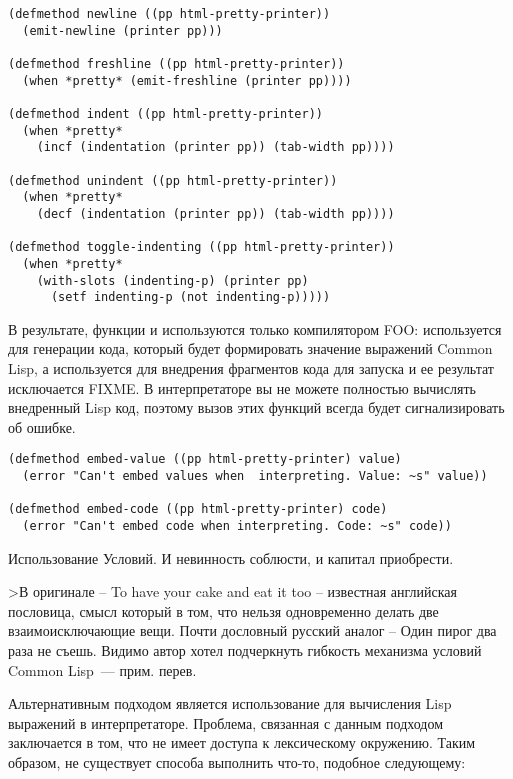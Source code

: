 \begin{lstlisting}
(defmethod newline ((pp html-pretty-printer))
  (emit-newline (printer pp)))

(defmethod freshline ((pp html-pretty-printer))
  (when *pretty* (emit-freshline (printer pp))))

(defmethod indent ((pp html-pretty-printer))
  (when *pretty* 
    (incf (indentation (printer pp)) (tab-width pp))))

(defmethod unindent ((pp html-pretty-printer))
  (when *pretty* 
    (decf (indentation (printer pp)) (tab-width pp))))

(defmethod toggle-indenting ((pp html-pretty-printer))
  (when *pretty* 
    (with-slots (indenting-p) (printer pp)
      (setf indenting-p (not indenting-p)))))
\end{lstlisting}

В результате, функции  и  используются только
компилятором FOO:  используется для генерации кода, который будет
формировать значение выражений Common Lisp, а  используется для внедрения
фрагментов кода для запуска и ее результат исключается FIXME. В интерпретаторе вы не
можете полностью вычислять внедренный Lisp код, поэтому вызов этих функций всегда будет
сигнализировать об ошибке.

\begin{lstlisting}
(defmethod embed-value ((pp html-pretty-printer) value)
  (error "Can't embed values when  interpreting. Value: ~s" value))

(defmethod embed-code ((pp html-pretty-printer) code)
  (error "Can't embed code when interpreting. Code: ~s" code))
\end{lstlisting}


Использование Условий. И невинность соблюсти, и капитал приобрести.

>В оригинале – To have your cake and eat it too – известная английская пословица, смысл
который в том, что нельзя одновременно делать две взаимоисключающие вещи. Почти дословный
русский аналог – Один пирог два раза не съешь. Видимо автор хотел подчеркнуть гибкость
механизма условий Common Lisp~--- прим. перев.

Альтернативным подходом является использование  для вычисления Lisp выражений в
интерпретаторе. Проблема, связанная с данным подходом заключается в том, что 
не имеет доступа к лексическому окружению. Таким образом, не существует способа выполнить
что-то, подобное следующему:

